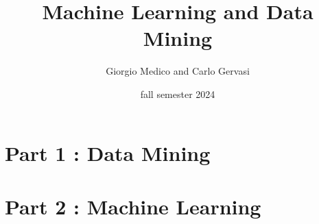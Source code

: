 \documentclass[openany]{book}
\title{Machine Learning and Data Mining}
\author{Giorgio Medico and Carlo Gervasi}
\date{fall semester 2024}
\theoremstyle{definition}
\theoremstyle{remark}
\begin{document}
\maketitle
\tableofcontents

\part{Part 1 : Data Mining}


\part{Part 2 : Machine Learning}

\end{document}

